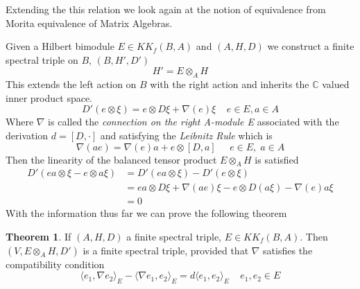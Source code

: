 \documentclass[a4paper]{article}
\theoremstyle{definition}
\theoremstyle{definition}
\theoremstyle{definition}
\theoremstyle{theorem}
\newtheorem{theorem}{Theorem}
\theoremstyle{theorem}
\theoremstyle{theorem}
\theoremstyle{definition}
\begin{document}
Extending the this relation we look again at  the notion of equivalence from
Morita equivalence of Matrix Algebras.
\newline

Given a Hilbert bimodule $E \in KK_f(B, A)$ and $(A, H, D)$ we construct
a finite spectral triple on $B$, $(B, H', D')$
\begin{equation}
    H' = E \otimes _A H
\end{equation}
This extends the left action on $B$ with the right action and inherits the
$\mathbb{C}$ valued inner product space.
\begin{equation}
    D'(e\otimes \xi) = e \otimes D \xi + \nabla (e) \xi \;\;\;\; e\in
    E, a\in A
\end{equation}
Where $\nabla$ is called the \textit{connection on the right A-module E}
associated with the  derivation $d=[D, \cdot]$ and satisfying the
\textit{Leibnitz Rule} which is
\begin{equation}
    \nabla(ae) = \nabla(e)a + e \otimes [D, a] \;\;\;\;\;  e\in E,\; a\in A
\end{equation}
Then the linearity of the balanced tensor product $E \otimes _A H$ is
satisfied
\begin{align*}
    D'(ea \otimes \xi - e \otimes a \xi) &=  D'(ea \otimes \xi) - D'(e
    \otimes \xi) \\
    &= ea\otimes D\xi + \nabla(ae) \xi - e \otimes D(a\xi ) - \nabla (e)a
    \xi \\
    &= 0
\end{align*}
With the information thus far we can prove the following theorem
\begin{theorem}
    If $(A, H, D)$ a finite spectral triple, $E \in KK_f(B, A)$.
    Then $(V, E\otimes _A H, D')$ is a finite spectral triple, provided that
    $\nabla$ satisfies the compatibility condition
    \begin{equation}
        \langle e_1, \nabla e_2 \rangle _E - \langle \nabla e_1, e_2
        \rangle _E = d\langle e_1, e_2 \rangle _E \;\;\;\; e_1, e_2 \in E
    \end{equation}
\end{theorem}
\end{document}
